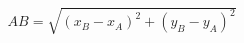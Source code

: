 \documentclass[preview]{standalone}
\begin{document}
\begin{align*}
AB = \sqrt{(x_B - x_A)^2 + (y_B - y_A)^2}
\end{align*}
\end{document}
